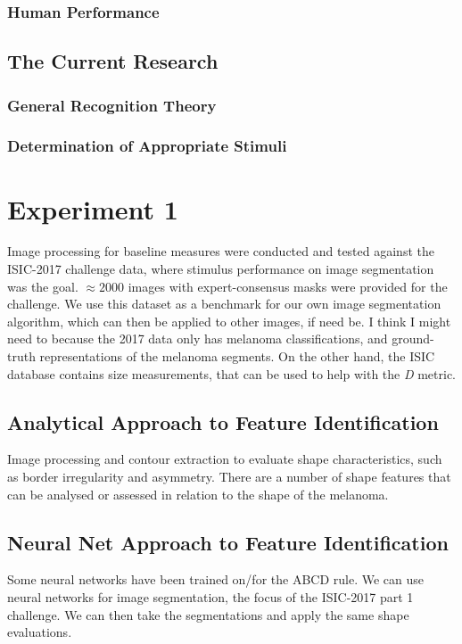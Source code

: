 \documentclass[a4paper, natbib, doc, 12pt]{apa7}
\begin{document}
\subsubsection{Human Performance}
\subsection{The Current Research}
\subsubsection{General Recognition Theory}
\subsubsection{Determination of Appropriate Stimuli}
\section{Experiment 1}
Image processing for baseline measures were conducted and tested against the ISIC-2017 challenge data, where stimulus performance on image segmentation was the goal. $\approx2000$ images with expert-consensus masks were provided for the challenge. We use this dataset as a benchmark for our own image segmentation algorithm, which can then be applied to other images, if need be. I think I might need to because the 2017 data only has melanoma classifications, and ground-truth representations of the melanoma segments. On the other hand, the ISIC database contains size measurements, that can be used to help with the \textit{D} metric. 

\subsection{Analytical Approach to Feature Identification}
Image processing and contour extraction to evaluate shape characteristics, such as border irregularity and asymmetry. There are a number of shape features that can be analysed or assessed in relation to the shape of the melanoma.

\subsection{Neural Net Approach to Feature Identification}
Some neural networks have been trained on/for the ABCD rule. 
We can use neural networks for image segmentation, the focus of the ISIC-2017 part 1 challenge. We can then take the segmentations and apply the same shape evaluations. 
\end{document}
